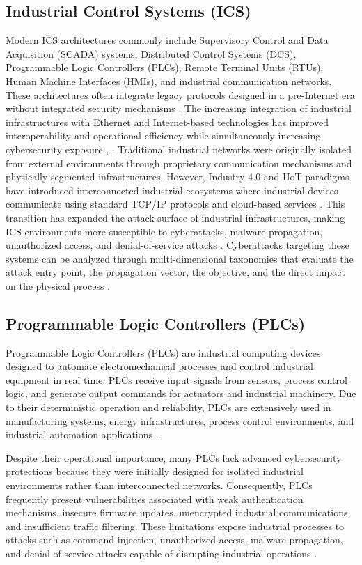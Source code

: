 \documentclass[sigconf]{acmart}
\begin{document}
\subsection{Industrial Control Systems (ICS)}
Modern ICS architectures commonly include Supervisory Control and Data Acquisition (SCADA) systems, Distributed Control Systems (DCS), Programmable Logic Controllers (PLCs), Remote Terminal Units (RTUs), Human Machine Interfaces (HMIs), and industrial communication networks. These architectures often integrate legacy protocols designed in a pre-Internet era without integrated security mechanisms \cite{Zhu2011Taxonomy}. The increasing integration of industrial infrastructures with Ethernet and Internet-based technologies has improved interoperability and operational efficiency while simultaneously increasing cybersecurity exposure \cite{Bhamare2020ICS}, \cite{Kayan2021ICPS}. Traditional industrial networks were originally isolated from external environments through proprietary communication mechanisms and physically segmented infrastructures. However, Industry 4.0 and IIoT paradigms have introduced interconnected industrial ecosystems where industrial devices communicate using standard TCP/IP protocols and cloud-based services \cite{Souza2021SmartManufacturing}. This transition has expanded the attack surface of industrial infrastructures, making ICS environments more susceptible to cyberattacks, malware propagation, unauthorized access, and denial-of-service attacks \cite{Pedreira2021Industry40}. Cyberattacks targeting these systems can be analyzed through multi-dimensional taxonomies that evaluate the attack entry point, the propagation vector, the objective, and the direct impact on the physical process \cite{Zhu2011Taxonomy}.

\subsection{Programmable Logic Controllers (PLCs)}
Programmable Logic Controllers (PLCs) are industrial computing devices designed to automate electromechanical processes and control industrial equipment in real time. PLCs receive input signals from sensors, process control logic, and generate output commands for actuators and industrial machinery. Due to their deterministic operation and reliability, PLCs are extensively used in manufacturing systems, energy infrastructures, process control environments, and industrial automation applications \cite{Makrakis2021ICS}.

Despite their operational importance, many PLCs lack advanced cybersecurity protections because they were initially designed for isolated industrial environments rather than interconnected networks. Consequently, PLCs frequently present vulnerabilities associated with weak authentication mechanisms, insecure firmware updates, unencrypted industrial communications, and insufficient traffic filtering. These limitations expose industrial processes to attacks such as command injection, unauthorized access, malware propagation, and denial-of-service attacks capable of disrupting industrial operations \cite{Nicholson2021ICSAttacks}.
\end{document}
